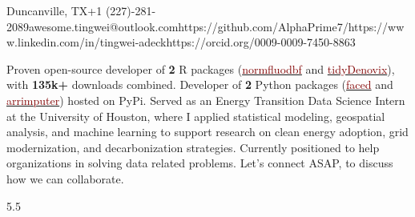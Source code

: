 \documentclass[9pt]{adeckcv} %
\begin{document}
  
{Duncanville, TX}{+1 (227)-281-2089}{awesome.tingwei@outlook.com}{https://github.com/AlphaPrime7/}{https://www.linkedin.com/in/tingwei-adeck}{https://orcid.org/0009-0009-7450-8863}

  

\begin{minipage}[t]{0.4\textwidth}
\vspace{-\baselineskip} 

{Proven open-source developer of \textbf{2} R packages (\href{https://alphaprime7.github.io/normfluodbf/}{\textcolor{maroon}{normfluodbf}} and \href{https://alphaprime7.github.io/tidyDenovix/}{\textcolor{maroon}{tidyDenovix}}), with \textbf{135k+} downloads combined. Developer of \textbf{2} Python packages (\href{https://pypi.org/project/faced/}{\textcolor{maroon}{faced}} and \href{https://pypi.org/project/arrimputer/1.3.0/}{\textcolor{maroon}{arrimputer}}) hosted on PyPi.} 
{Served as an Energy Transition Data Science Intern at the University of Houston, where I applied statistical modeling, geospatial analysis, and machine learning to support research on clean energy adoption, grid modernization, and decarbonization strategies.}
{Currently positioned to help organizations in solving data related problems. Let’s connect ASAP, to discuss how we can collaborate.}


\end{minipage}
\hfill %
\begin{minipage}[t]{0.5\textwidth} %
	\vspace{-\baselineskip} %
	\begin{barchart}{5.5}
	\end{barchart}
\end{minipage}
\end{document}
